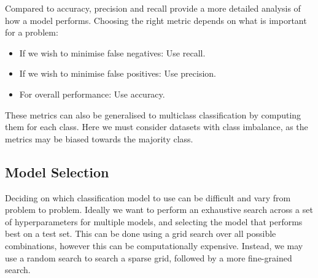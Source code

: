 \documentclass{article}
\begin{document}
Compared to accuracy, precision and recall provide a more detailed
analysis of how a model performs. Choosing the right metric depends on
what is important for a problem:
\begin{itemize}
    \item If we wish to minimise false negatives: Use recall.
    \item If we wish to minimise false positives: Use precision.
    \item For overall performance: Use accuracy.
\end{itemize}
These metrics can also be generalised to multiclass classification by
computing them for each class. Here we must consider datasets with class
imbalance, as the metrics may be biased towards the majority class.
\subsection{Model Selection}
Deciding on which classification model to use can be difficult and vary
from problem to problem. Ideally we want to perform an exhaustive
search across a set of hyperparameters for multiple models, and
selecting the model that performs best on a test set. This can be done
using a grid search over all possible combinations, however this can be
computationally expensive. Instead, we may use a random search to
search a sparse grid, followed by a more fine-grained search. \newpage
\end{document}

